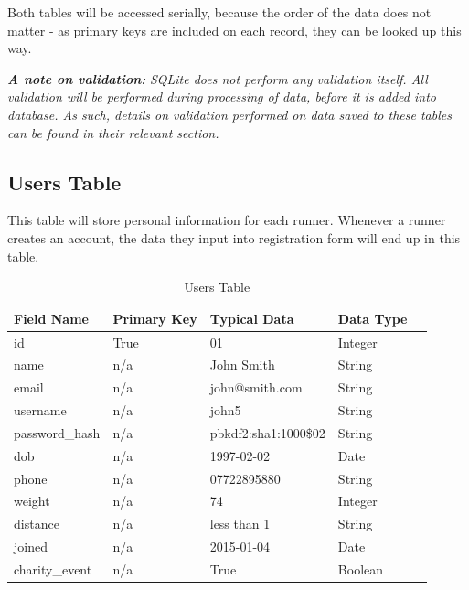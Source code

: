 \documentclass{article}[12pt,a4paper]
\begin{document}
Both tables will be accessed serially, because the order of the data does not matter - as primary keys are included on each record, they can be looked up this way.

\textbf{\textit{A note on validation: }}\textit{SQLite does not perform any validation itself. All validation will be performed during processing of data, before it is added into database. As such, details on validation performed on data saved to these tables can be found in their relevant section.}

\subsection{Users Table}
This table will store personal information for each runner. Whenever a runner creates an account, the data they input into registration form will end up in this table.

\begin{table}[htbp]
\begin{tabular}{|l|l|l|l|l|}
\hline
\textbf{Field Name}     & \textbf{Primary Key} & \textbf{Typical Data} & \textbf{Data Type} \\ \hline
id             & True        & 01                   & Integer   \\ \hline
name           & n/a         & John Smith           & String    \\ \hline
email          & n/a         & john@smith.com       & String    \\ \hline
username       & n/a         & john5                & String    \\ \hline
password\_hash & n/a         & pbkdf2:sha1:1000\$02 & String    \\ \hline
dob            & n/a         & 1997-02-02           & Date      \\ \hline
phone          & n/a         & 07722895880          & String    \\ \hline
weight         & n/a         & 74                   & Integer   \\ \hline
distance       & n/a         & less than 1          & String    \\ \hline
joined         & n/a         & 2015-01-04           & Date      \\ \hline
charity\_event & n/a         & True                 & Boolean   \\ \hline
\end{tabular}
\caption{Users Table}
\end{table}
\end{document}
